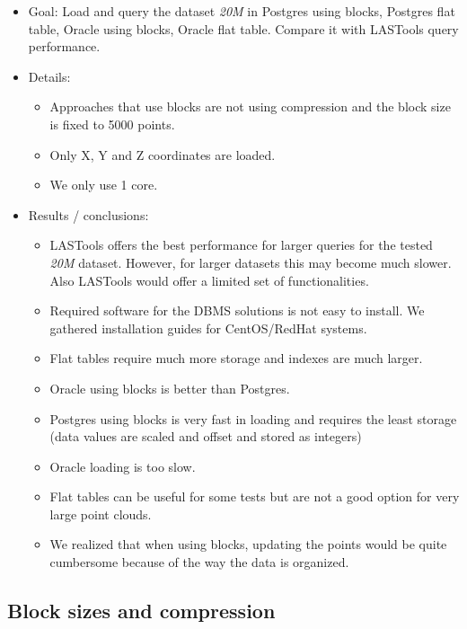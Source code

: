 \documentclass[a4paper,11pt]{article}
\begin{document}
\begin{itemize}
	\item Goal: 	Load and query the dataset \textit{20M} in Postgres using blocks, Postgres flat table, Oracle using blocks, Oracle flat table. Compare it with LASTools query performance. 
	\item Details: 
	\begin{itemize}
		\item Approaches that use blocks are not using compression and the block size is fixed to 5000 points. 
		\item Only X, Y and Z coordinates are loaded.
		\item We only use 1 core.
	\end{itemize}				
	\item Results / conclusions: 
	\begin{itemize}
		\item LASTools offers the best performance for larger queries for the tested \textit{20M} dataset. However, for larger datasets this may become much slower. Also LASTools would offer a limited set of functionalities.
		\item Required software for the DBMS solutions is not easy to install. We gathered installation guides for CentOS/RedHat systems.
		\item Flat tables require much more storage and indexes are much larger.
		\item Oracle using blocks is better than Postgres.
		\item Postgres using blocks is very fast in loading and requires the least storage (data values are scaled and offset and stored as integers)
		\item Oracle loading is too slow.
		\item Flat tables can be useful for some tests but are not a good option for very large point clouds.
		\item We realized that when using blocks, updating the points would be quite cumbersome because of the way the data is organized.
	\end{itemize}			
\end{itemize}

\subsection{Block sizes and compression}
\end{document}
